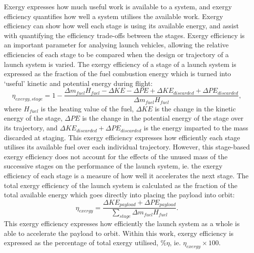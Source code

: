 Exergy expresses how much useful work is available to a system, and exergy efficiency quantifies how well a system utilises the available work. 
 Exergy efficiency can show how well each stage is using its available energy, and assist with quantifying the efficiency trade-offs between the stages.
 Exergy efficiency is an important parameter for analysing launch vehicles, allowing the relative efficiencies of each stage to be compared when the design or trajectory of a launch system is varied\cite{Gilbert2015}. The exergy efficiency of a stage of a launch system is expressed as the fraction of the fuel combustion energy which is turned into `useful' kinetic and potential energy during flight:
\begin{equation}
\eta_{exergy,stage} = 1 - \frac{\Delta m_{fuel}H_{fuel} - \Delta KE -\Delta PE + \Delta KE_{discarded} + \Delta PE_{discarded}}{\Delta m_{fuel}H_{fuel}},
\end{equation}
where $H_{fuel}$ is the heating value of the fuel, $\Delta KE$ is the change in the kinetic energy of the stage, $\Delta PE$ is the change in the potential energy of the stage over its trajectory, and $\Delta KE_{discarded} + \Delta PE_{discarded}$ is the energy imparted to the mass discarded at staging.
This exergy efficiency expresses how efficiently each stage utilises its available fuel over each individual trajectory. However, this stage-based exergy efficiency does not account for the effects of the unused mass of the successive stages on the performance of the launch system, ie. the exergy efficiency of each stage is a measure of how well it accelerates the next stage. The total exergy efficiency of the launch system is calculated as the fraction of the total available energy which goes directly into placing the payload into orbit:
\begin{equation}
\eta_{exergy} = \frac{\Delta KE_{payload} + \Delta PE_{payload}}{\sum_{stage} \Delta m_{fuel}H_{fuel}}.
\end{equation}
This exergy efficiency expresses how efficiently the launch system as a whole is able to accelerate the payload to orbit. 
Within this work, exergy efficiency is expressed as the percentage of total exergy utilised, \%$\eta$, ie. $\eta_{exergy} \times 100$.


